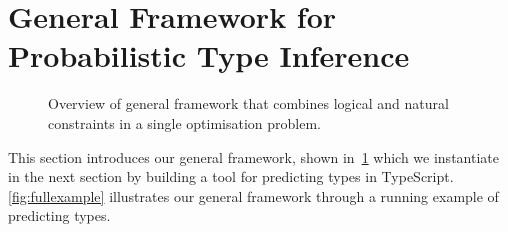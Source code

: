 \documentclass[acmsmall, review, anonymous]{acmart}\settopmatter{printfolios=true,printccs=false,printacmref=false}
\begin{document}
%
\section{General Framework for Probabilistic Type Inference} \label{sec:framework}
\begin{figure}[!t]
    \centering
    \def\svgwidth{\linewidth}
    
    \caption{Overview of general framework that combines logical
    and natural constraints in a single optimisation problem.} \label{fig:overview}
\end{figure}
This section introduces our general framework, shown in~\cref{fig:overview}
which we instantiate in the next section by building a tool for
predicting types in TypeScript.
\cref{fig:fullexample} illustrates our general framework through a running example of predicting types. 
\end{document}
